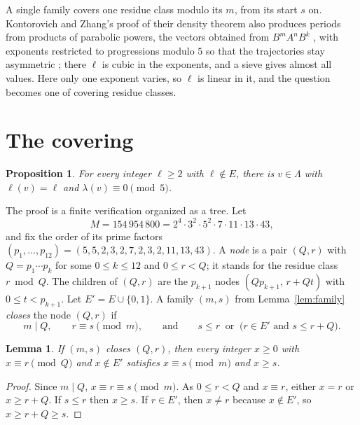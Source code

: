 \documentclass[11pt]{article}
\newtheorem{proposition}[theorem]{Proposition}
\newtheorem{lemma}[theorem]{Lemma}
\theoremstyle{definition}
\theoremstyle{remark}
\begin{document}
A single family covers one residue class modulo its $m$, from its start
$s$ on. Kontorovich and Zhang's proof of their density theorem also
produces periods from products of parabolic powers, the vectors obtained
from $B^mA^nB^k$ \cite[(4.1)]{KZ}, with exponents restricted to progressions modulo $5$ so that
the trajectories stay asymmetric \cite[\S4]{KZ}; there $\ell$ is cubic in
the exponents, and a sieve gives almost all values. Here only one exponent
varies, so $\ell$ is linear in it, and the question becomes one of covering
residue classes.

\section{The covering}\label{sec:covering}

\begin{proposition}\label{prop:cover}
For every integer $\ell\ge2$ with $\ell\notin E$, there is $v\in\Lambda$
with $\ell(v)=\ell$ and $\lambda(v)\equiv0\pmod5$.
\end{proposition}

The proof is a finite verification organized as a tree. Let
\[
M=154\,954\,800=2^4\cdot3^2\cdot5^2\cdot7\cdot11\cdot13\cdot43,
\]
and fix the order of its prime factors
$(p_1,\dots,p_{12})=(5,5,2,3,2,7,2,3,2,11,13,43)$. A \emph{node} is a pair
$(Q,r)$ with $Q=p_1\cdots p_k$ for some $0\le k\le12$ and $0\le r<Q$; it
stands for the residue class $r\bmod Q$. The children of $(Q,r)$ are the
$p_{k+1}$ nodes $(Qp_{k+1},\,r+Qt)$ with $0\le t<p_{k+1}$. Let
$E'=E\cup\{0,1\}$. A family $(m,s)$ from Lemma~\ref{lem:family}
\emph{closes} the node $(Q,r)$ if
\[
m\mid Q,\qquad r\equiv s\pmod m,\qquad\text{and}\qquad
s\le r\ \text{ or }\ \bigl(r\in E'\text{ and } s\le r+Q\bigr).
\]

\begin{lemma}\label{lem:leaf}
If $(m,s)$ closes $(Q,r)$, then every integer $x\ge0$ with
$x\equiv r\pmod Q$ and $x\notin E'$ satisfies $x\equiv s\pmod m$ and
$x\ge s$.
\end{lemma}

\begin{proof}
Since $m\mid Q$, $x\equiv r\equiv s\pmod m$. As $0\le r<Q$ and
$x\equiv r$, either $x=r$ or $x\ge r+Q$. If $s\le r$ then $x\ge s$. If
$r\in E'$, then $x\ne r$ because $x\notin E'$, so $x\ge r+Q\ge s$.
\end{proof}
\end{document}
